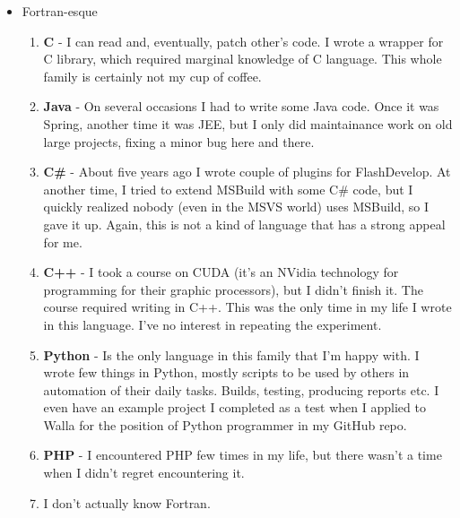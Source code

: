 \documentclass[oneside]{memoir}
\begin{document}
\begin{itemize}
\item Fortran-esque
\begin{enumerate}
\item \textbf{C} - I can read and, eventually, patch other's code.  I wrote a wrapper
for C library, which required marginal knowledge of C language.  This
whole family is certainly not my cup of coffee.
\item \textbf{Java} - On several occasions I had to write some Java code.  Once it was
Spring, another time it was JEE, but I only did maintainance work on old
large projects, fixing a minor bug here and there.
\item \textbf{C\#} - About five years ago I wrote couple of plugins for FlashDevelop.
At another time, I tried to extend MSBuild with some C\# code, but I
quickly realized nobody (even in the MSVS world) uses MSBuild, so I gave
it up.  Again, this is not a kind of language that has a strong appeal
for me.
\item \textbf{C++} - I took a course on CUDA (it's an NVidia technology for programming
for their graphic processors), but I didn't finish it.  The course
required writing in C++.  This was the only time in my life I wrote in
this language.  I've no interest in repeating the experiment.
\item \textbf{Python} - Is the only language in this family that I'm happy with.  I
wrote few things in Python, mostly scripts to be used by others in
automation of their daily tasks.  Builds, testing, producing reports etc.
I even have an example project I completed as a test when I applied to
Walla for the position of Python programmer in my GitHub repo.
\item \textbf{PHP} - I encountered PHP few times in my life, but there wasn't a time
when I didn't regret encountering it.
\item I don't actually know Fortran.
\end{enumerate}


\end{itemize}
\end{document}
